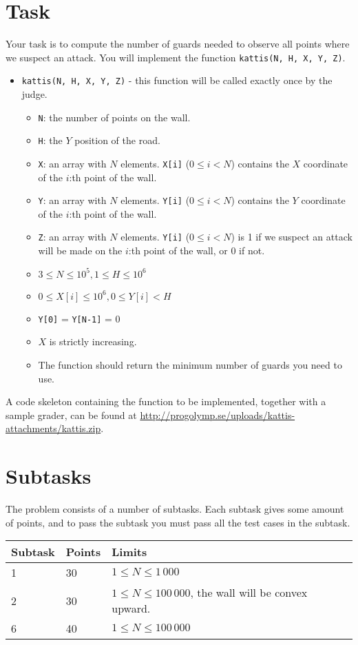 \section*{Task}
Your task is to compute the number of guards needed to observe all points where we suspect an attack. You will implement the function
\texttt{kattis(N, H, X, Y, Z)}.

\begin{itemize}
  \item \texttt{kattis(N, H, X, Y, Z)} - this function will be called exactly once by the judge.
  \begin{itemize}
    \item \texttt{N}: the number of points on the wall.
    \item \texttt{H}: the $Y$ position of the road.
    \item \texttt{X}: an array with $N$ elements. \texttt{X[i]} ($0 \le i < N$) contains the $X$ coordinate of the $i$:th point of the wall.
    \item \texttt{Y}: an array with $N$ elements. \texttt{Y[i]} ($0 \le i < N$) contains the $Y$ coordinate of the $i$:th point of the wall.
    \item \texttt{Z}: an array with $N$ elements. \texttt{Y[i]} ($0 \le i < N$) is 1 if we suspect an attack will be made on the $i$:th point of the wall, or 0 if not.
    \item $3 \le N \le 10^5, 1 \le H \le 10^6$
    \item $0 \le X[i] \le 10^6, 0 \le Y[i] < H$
    \item \texttt{Y[0]} = \texttt{Y[N-1]} = 0
    \item $X$ is strictly increasing.
    \item The function should return the minimum number of guards you need to use.
  \end{itemize}
\end{itemize}

A code skeleton containing the function to be implemented, together with a sample grader, can be found at
\url{http://progolymp.se/uploads/kattis-attachments/kattis.zip}.

\section*{Subtasks}
The problem consists of a number of subtasks. Each subtask gives some amount of points, and to pass
the subtask you must pass all the test cases in the subtask.

\begin{tabular}{|l|l|l|}
  \hline
  \textbf{Subtask} & \textbf{Points} & \textbf{Limits} \\ \hline
  1 & 30 & $1 \le N \le 1\,000$ \\ \hline
  2 & 30 & $1 \le N \le 100\,000$, the wall will be convex upward. \\ \hline
  6 & 40 & $1 \le N \le 100\,000$ \\ \hline
\end{tabular}


